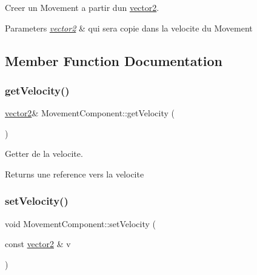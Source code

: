 Creer un Movement a partir d\textquotesingle{}un \hyperlink{structvector2}{vector2}. 


\begin{DoxyParams}{Parameters}
{\em \hyperlink{structvector2}{vector2}} & qui sera copie dans la velocite du Movement \\
\hline
\end{DoxyParams}


\subsection{Member Function Documentation}
\hypertarget{class_movement_component_a1b3cc0445b34ceafb79d694ecafbcd2c}{}\label{class_movement_component_a1b3cc0445b34ceafb79d694ecafbcd2c} 
\subsubsection{\texorpdfstring{get\+Velocity()}{getVelocity()}}
{\footnotesize\ttfamily \hyperlink{structvector2}{vector2}\& Movement\+Component\+::get\+Velocity (\begin{DoxyParamCaption}{ }\end{DoxyParamCaption})\hspace{0.3cm}{\ttfamily [inline]}}



Getter de la velocite. 

\begin{DoxyReturn}{Returns}
une reference vers la velocite 
\end{DoxyReturn}
\hypertarget{class_movement_component_a713784d4a7ccca4e4ad946f73d2db6cd}{}\label{class_movement_component_a713784d4a7ccca4e4ad946f73d2db6cd} 
\subsubsection{\texorpdfstring{set\+Velocity()}{setVelocity()}\hspace{0.1cm}{\footnotesize\ttfamily [1/2]}}
{\footnotesize\ttfamily void Movement\+Component\+::set\+Velocity (\begin{DoxyParamCaption}\item[{const \hyperlink{structvector2}{vector2} \&}]{v }\end{DoxyParamCaption})\hspace{0.3cm}{\ttfamily [inline]}}



